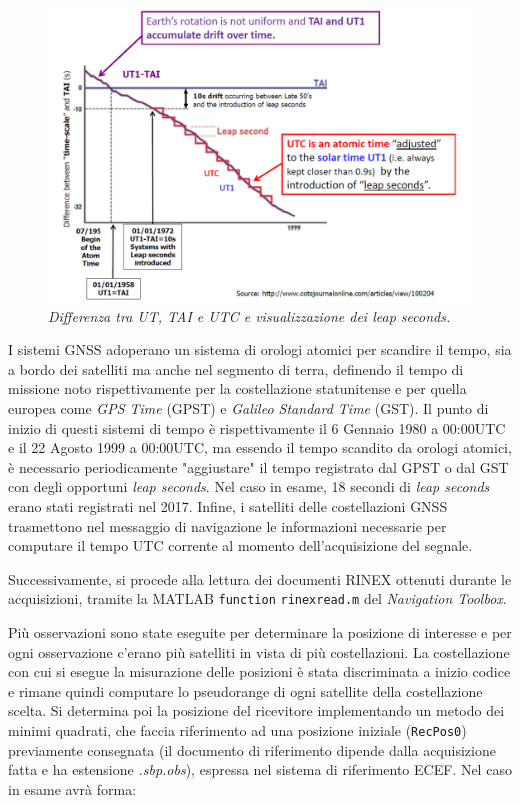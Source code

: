 \documentclass[a4paper,11pt,twoside]{book}
\begin{document}
\begin{itemize}[-]
		\begin{figure}[H]
			\centering
			\includegraphics[scale=0.55]{"Immagini workbook/Immagini esp3/leap"}
			\caption{\textit{Differenza tra UT, TAI e UTC e visualizzazione dei leap seconds.}}
			\label{leap}
		\end{figure}
		
		I sistemi GNSS adoperano un sistema di orologi atomici per scandire il tempo, sia a bordo dei satelliti ma anche nel segmento di terra, definendo il tempo di missione noto rispettivamente per la costellazione statunitense e per quella europea come \textit{GPS Time} (GPST) e \textit{Galileo Standard Time} (GST). Il punto di inizio di questi sistemi di tempo è rispettivamente il 6 Gennaio 1980 a 00:00UTC e il 22 Agosto 1999 a 00:00UTC, ma essendo il tempo scandito da orologi atomici, è necessario periodicamente "aggiustare" il tempo registrato dal GPST o dal GST con degli opportuni \textit{leap seconds}. Nel caso in esame, 18 secondi di \textit{leap seconds} erano stati registrati nel 2017. Infine, i satelliti delle costellazioni GNSS trasmettono nel messaggio di navigazione le informazioni necessarie per computare il tempo UTC corrente al momento dell'acquisizione del segnale.		
	\end{itemize}
	
	Successivamente, si procede alla lettura dei documenti RINEX ottenuti durante le acquisizioni, tramite la MATLAB \texttt{function} \texttt{rinexread.m} del \textit{Navigation Toolbox}. 
	
	Più osservazioni sono state eseguite per determinare la posizione di interesse e per ogni osservazione c'erano più satelliti in vista di più costellazioni. La costellazione con cui si esegue la misurazione delle posizioni è stata discriminata a inizio codice e rimane quindi computare lo pseudorange di ogni satellite della costellazione scelta. Si determina poi la posizione del ricevitore implementando un metodo dei minimi quadrati, che faccia riferimento ad una posizione iniziale (\texttt{RecPos0}) previamente consegnata (il documento di riferimento dipende dalla acquisizione fatta e ha estensione \textsl{.sbp.obs}), espressa nel sistema di riferimento ECEF. Nel caso in esame avrà forma:
	
\end{document}
